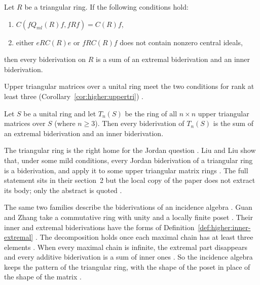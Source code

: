 \begin{theorem}\label{thm:higher:triangularbid}
Let $R$ be a triangular ring. If the following conditions hold:
\begin{enumerate}
\item $C(fQ_{ml}(R)f,fRf)=C(R)f$,
\item either $eRC(R)e$ or $fRC(R)f$ does not contain nonzero central ideals,
\end{enumerate}
then every biderivation on $R$ is a sum of an extremal biderivation and an
inner biderivation.
\end{theorem}

Upper triangular matrices over a unital ring meet the two conditions for rank
at least three (Corollary~\ref{cor:higher:uppertri})
\cite[p.~1956]{Wang2016Bideriv}.

\begin{corollary}\label{cor:higher:uppertri}
Let $S$ be a unital ring and let $T_n(S)$ be the ring of all $n\times n$ upper
triangular matrices over $S$ (where $n\geq 3$). Then every biderivation of
$T_n(S)$ is the sum of an extremal biderivation and an inner biderivation.
\end{corollary}

The triangular ring is the right home for the Jordan question
\cite[p.~1417]{Liu2021JordanBid}. Liu and Liu show that, under some mild
conditions, every Jordan biderivation of a triangular ring is a biderivation,
and apply it to some upper triangular matrix rings
\cite[p.~1417]{Liu2021JordanBid}. The full statement sits in their section~2
but the local copy of the paper does not extract its body; only the abstract
is quoted \cite[p.~1417]{Liu2021JordanBid}.

The same two families describe the biderivations of an incidence algebra
\cite[p.~3]{GuanZhang2024}. Guan and Zhang take a commutative ring with unity
and a locally finite poset \cite[p.~2]{GuanZhang2024}. Their inner and
extremal biderivations have the forms of
Definition~\ref{def:higher:inner-extremal} \cite[p.~3]{GuanZhang2024}. The
decomposition holds once each maximal chain has at least three elements
\cite[Theorem~4.10, p.~13]{GuanZhang2024}. When every maximal chain is
infinite, the extremal part disappears and every additive biderivation is a
sum of inner ones \cite[p.~1]{GuanZhang2024}. So the incidence algebra keeps
the pattern of the triangular ring, with the shape of the poset in place of
the shape of the matrix \cite[p.~1]{GuanZhang2024}.

